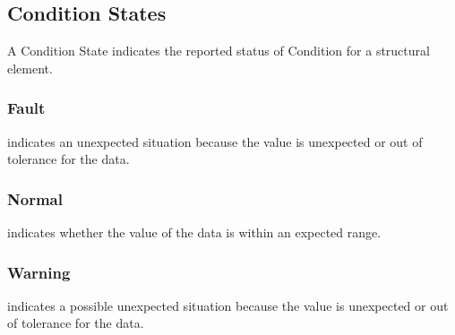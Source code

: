 \subsection{Condition States} \label{sec:Condition States}


A \gls{Condition State} indicates the reported status of \gls{Condition} for a \gls{structural element}.


\subsubsection{Fault}
\label{sec:Fault}



 indicates an unexpected situation because the value is unexpected or out of tolerance for the data.



\subsubsection{Normal}
\label{sec:Normal}



 indicates whether the value of the data is within an expected range.



\subsubsection{Warning}
\label{sec:Warning}



 indicates a possible unexpected situation because the value is unexpected or out of tolerance for the data.


